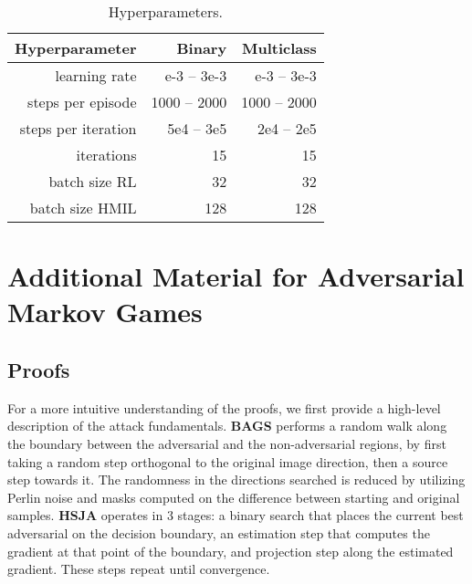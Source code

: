 \begin{table}[h!]
\centering
\renewcommand*{\arraystretch}{1.05}
\caption{Hyperparameters.}
\begin{tabular}{|r|r|r|}
\toprule
\textbf{Hyperparameter} &\bf Binary &\bf Multiclass\\
\midrule
learning rate & e-3 -- 3e-3 & e-3 -- 3e-3 \\
steps per episode & 1000 -- 2000 & 1000 -- 2000 \\
steps per iteration & 5e4 -- 3e5 & 2e4 -- 2e5\\
iterations & 15 & 15\\
batch size RL& 32 & 32\\
batch size HMIL& 128 & 128\\
\bottomrule
\end{tabular}
\label{tbl:hyper}
\end{table}

\chapter{Additional Material for Adversarial Markov Games}\label{apx:markovgames}

\section{Proofs}
\label{apx:proofs}

For a more intuitive understanding of the proofs, we first provide a high-level description of the attack fundamentals.
\textbf{BAGS} \cite{brunner2019guessing} performs a random walk along the boundary between the adversarial and the non-adversarial regions, by first taking a random step orthogonal to the original image direction, then a source step towards it.
The randomness in the directions searched is reduced by utilizing Perlin noise and masks computed on the difference between starting and original samples.
\textbf{HSJA} \cite{chen2020hopskipjumpattack} operates in 3 stages: a binary search that places the current best adversarial on the decision boundary, an estimation step that computes the gradient at that point of the boundary, and projection step along the estimated gradient.
These steps repeat until convergence.
\vspace{1em}

